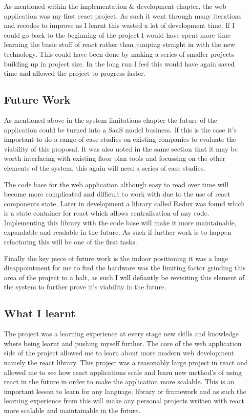 As mentioned within the implementation \& development chapter, the web application was my first react project. As such it went through many iterations and recodes to improve as I learnt this wasted a lot of development time. If I could go back to the beginning of the project I would have spent more time learning the basic stuff of react rather than jumping straight in with the new technology. This could have been done by making a series of smaller projects building up in project size. In the long run I feel this would have again saved time and allowed the project to progress faster.

\subsection{Future Work}
As mentioned above in the system limitations chapter the future of the application could be turned into a SaaS model business. If this is the case it's important to do a range of case studies on existing companies to evaluate the viability of this proposal. It was also noted in the same section that it may be worth interfacing with existing floor plan tools and focussing on the other elements of the system, this again will need a series of case studies.

The code base for the web application although easy to read over time will become more complicated and difficult to work with due to the use of react components state. Later in development a library called Redux was found which is a state container for react which allows centralisation of any code. Implementing this library with the code base will make it more maintainable, expandable and readable in the future. As such if further work is to happen refactoring this will be one of the first tasks.

Finally the key piece of future work is the indoor positioning it was a huge disappointment for me to find the hardware was the limiting factor grinding this area of the project to a halt, as such I will defiantly be revisiting this element of the system to further prove it's viability in the future. 

\subsection{What I learnt} %
The project was a learning experience at every stage new skills and knowledge where being learnt and pushing myself further. The core of the web application side of the project allowed me to learn about more modern web development namely the react library. This project was a reasonably large project in react and allowed me to see how react applications scale and learn new method's of using react in the future in order to make the application more scalable. This is an important lesson to learn for any language, library or framework and as such the learning experience from this will make any personal projects written with react more scalable and maintainable in the future.

